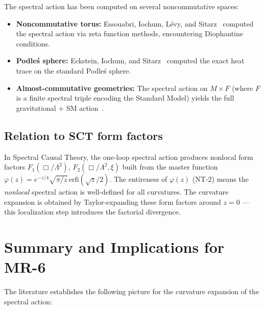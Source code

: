 \documentclass[11pt,a4paper]{article}
\newcommand{\Lam}{\Lambda}
\begin{document}
The spectral action has been computed on several noncommutative spaces:

\begin{itemize}
  \item \textbf{Noncommutative torus:} Essouabri, Iochum, L\'{e}vy, and
    Sitarz~\cite{ELS12} computed the spectral action via zeta function
    methods, encountering Diophantine conditions.
  \item \textbf{Podle\'{s} sphere:} Eckstein, Iochum, and Sitarz~\cite{EIS15}
    computed the exact heat trace on the standard Podle\'{s} sphere.
  \item \textbf{Almost-commutative geometries:} The spectral action on
    $M \times F$ (where $F$ is a finite spectral triple encoding the Standard
    Model) yields the full gravitational $+$ SM action~\cite{vS15,CC10}.
\end{itemize}

\subsection{Relation to SCT form factors}

In Spectral Causal Theory, the one-loop spectral action produces nonlocal
form factors $F_1(\Box/\Lam^2)$, $F_2(\Box/\Lam^2,\xi)$ built from the
master function
$\varphi(z) = e^{-z/4}\sqrt{\pi/z}\,\mathrm{erfi}(\sqrt{z}/2)$.
The entireness of $\varphi(z)$ (NT-2) means the \emph{nonlocal} spectral
action is well-defined for all curvatures.  The curvature expansion is
obtained by Taylor-expanding these form factors around $z = 0$ --- this
localization step introduces the factorial divergence.


\section{Summary and Implications for MR-6}\label{sec:summary}

The literature establishes the following picture for the curvature expansion
of the spectral action:
\end{document}

